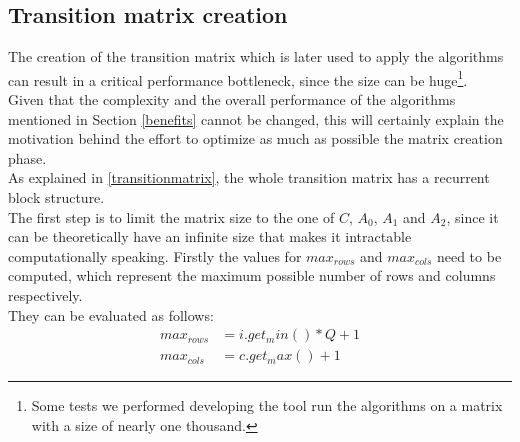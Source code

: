\subsection{Transition matrix creation} \label{matrixcreation}
The creation of the transition matrix which is later used to apply the algorithms can result in a critical performance bottleneck, since the size can be huge\footnote{Some tests we performed developing the tool run the algorithms on a matrix with a size of nearly one thousand.}.\\ 
Given that the complexity and the overall performance of the algorithms mentioned in Section \ref{benefits} cannot be changed, this will certainly explain the motivation behind the effort to optimize as much as possible the matrix creation phase.\\
As explained in \ref{transitionmatrix}, the whole transition matrix has a recurrent block structure.\\ 
The first step is to limit the matrix size to the one of \( C \), \( A_{0} \), \( A_{1} \) and \( A_{2} \), since it can be theoretically have an infinite size that makes it intractable computationally speaking. Firstly the values for \( max_{rows} \) and \( max_{cols} \) need to be computed, which represent the maximum possible number of rows and columns respectively.\\ 
They can be evaluated as follows: 
\begin{equation*}
\begin{split}
  max_{rows} &= i.get_min() * Q + 1 \\
  max_{cols} &= c.get_max() + 1
\end{split}
\end{equation*}

